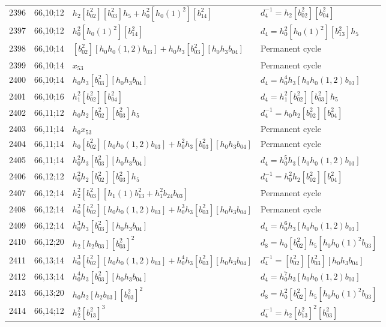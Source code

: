 \documentclass{article}
\begin{document}
\begin{longtable}{|l|l|>{\raggedright\arraybackslash}p{6cm}|>{\raggedright\arraybackslash}p{6cm}|}
\hline
2396 & 66,10;12 & $h_2[b_{02}^2][b_{03}^2]h_5 + h_0^2[h_0(1)^2][b_{14}^2]$ & $d_{4}^{-1}=h_2[b_{02}^2][b_{04}^2]$\\
2397 & 66,10;12 & $h_0^2[h_0(1)^2][b_{14}^2]$ &$d_{4}=h_0^2[h_0(1)^2][b_{13}^2]h_5$\\
\hline
2398 & 66,10;14 & $[b_{02}^2][h_0h_0(1, 2)b_{03}] + h_0h_3[b_{03}^2][h_0h_3b_{04}]$ & Permanent cycle\\
2399 & 66,10;14 & $x_{53}$ & Permanent cycle\\
2400 & 66,10;14 & $h_0h_3[b_{03}^2][h_0h_3b_{04}]$ &$d_{4}=h_0^4h_3[h_0h_0(1, 2)b_{03}]$\\
\hline
2401 & 66,10;16 & $h_1^2[b_{02}^2][b_{04}^2]$ &$d_{4}=h_1^2[b_{02}^2][b_{03}^2]h_5$\\
\hline
2402 & 66,11;12 & $h_0h_2[b_{02}^2][b_{03}^2]h_5$ & $d_{4}^{-1}=h_0h_2[b_{02}^2][b_{04}^2]$\\
\hline
2403 & 66,11;14 & $h_0x_{53}$ & Permanent cycle\\
2404 & 66,11;14 & $h_0[b_{02}^2][h_0h_0(1, 2)b_{03}] + h_0^2h_3[b_{03}^2][h_0h_3b_{04}]$ & Permanent cycle\\
2405 & 66,11;14 & $h_0^2h_3[b_{03}^2][h_0h_3b_{04}]$ &$d_{4}=h_0^5h_3[h_0h_0(1, 2)b_{03}]$\\
\hline
2406 & 66,12;12 & $h_0^2h_2[b_{02}^2][b_{03}^2]h_5$ & $d_{4}^{-1}=h_0^2h_2[b_{02}^2][b_{04}^2]$\\
\hline
2407 & 66,12;14 & $h_2^2[b_{03}^2][h_1(1)b_{13}^2 + h_1^2b_{24}b_{03}]$ & Permanent cycle\\
2408 & 66,12;14 & $h_0^2[b_{02}^2][h_0h_0(1, 2)b_{03}] + h_0^3h_3[b_{03}^2][h_0h_3b_{04}]$ & Permanent cycle\\
2409 & 66,12;14 & $h_0^3h_3[b_{03}^2][h_0h_3b_{04}]$ &$d_{4}=h_0^6h_3[h_0h_0(1, 2)b_{03}]$\\
\hline
2410 & 66,12;20 & $h_2[h_2b_{03}][b_{03}^2]^2$ &$d_{8}=h_0[b_{02}^2]h_5[h_0h_0(1)^2b_{03}]$\\
\hline
2411 & 66,13;14 & $h_0^3[b_{02}^2][h_0h_0(1, 2)b_{03}] + h_0^4h_3[b_{03}^2][h_0h_3b_{04}]$ & $d_{4}^{-1}=[b_{02}^2][b_{03}^2][h_0h_3b_{04}]$\\
2412 & 66,13;14 & $h_0^4h_3[b_{03}^2][h_0h_3b_{04}]$ &$d_{4}=h_0^7h_3[h_0h_0(1, 2)b_{03}]$\\
\hline
2413 & 66,13;20 & $h_0h_2[h_2b_{03}][b_{03}^2]^2$ &$d_{8}=h_0^2[b_{02}^2]h_5[h_0h_0(1)^2b_{03}]$\\
\hline
2414 & 66,14;12 & $h_2^2[b_{13}^2]^3$ & $d_{4}^{-1}=h_2[b_{13}^2]^2[b_{03}^2]$\\

\end{longtable}
\end{document}
